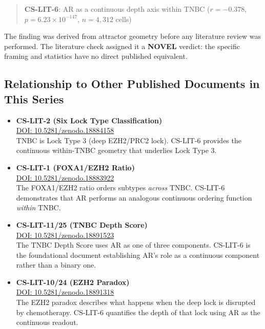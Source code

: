 \documentclass[12pt, a4paper]{article}
\begin{document}
\begin{quote}
\textbf{CS-LIT-6}: AR as a continuous depth axis
within TNBC ($r = -0.378$,
$p = 6.23 \times 10^{-147}$, $n = 4{,}312$ cells)
\end{quote}

The finding was derived from attractor geometry
before any literature review was performed. The
literature check assigned it a \textbf{NOVEL}
verdict: the specific framing and statistics
have no direct published equivalent.

\subsection{Relationship to Other Published
Documents in This Series}

\begin{itemize}
    \item \textbf{CS-LIT-2 (Six Lock Type
    Classification)}\\
    \href{https://doi.org/10.5281/zenodo.18884158}
    {DOI: 10.5281/zenodo.18884158}\\
    TNBC is Lock Type 3 (deep EZH2/PRC2 lock).
    CS-LIT-6 provides the continuous within-TNBC
    geometry that underlies Lock Type 3.

    \item \textbf{CS-LIT-1 (FOXA1/EZH2 Ratio)}\\
    \href{https://doi.org/10.5281/zenodo.18883922}
    {DOI: 10.5281/zenodo.18883922}\\
    The FOXA1/EZH2 ratio orders subtypes
    \textit{across} TNBC. CS-LIT-6 demonstrates
    that AR performs an analogous continuous
    ordering function \textit{within} TNBC.

    \item \textbf{CS-LIT-11/25 (TNBC Depth Score)}\\
    \href{https://doi.org/10.5281/zenodo.18891523}
    {DOI: 10.5281/zenodo.18891523}\\
    The TNBC Depth Score uses AR as one of three
    components. CS-LIT-6 is the foundational
    document establishing AR's role as a
    continuous component rather than a binary one.

    \item \textbf{CS-LIT-10/24 (EZH2 Paradox)}\\
    \href{https://doi.org/10.5281/zenodo.18891318}
    {DOI: 10.5281/zenodo.18891318}\\
    The EZH2 paradox describes what happens when
    the deep lock is disrupted by chemotherapy.
    CS-LIT-6 quantifies the depth of that lock
    using AR as the continuous readout.
\end{itemize}
\end{document}
